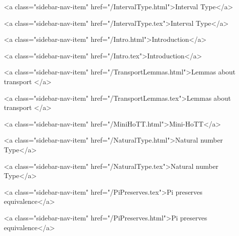           <a class="sidebar-nav-item" href="/IntervalType.html">Interval Type</a>
        
      
    
      
        
          <a class="sidebar-nav-item" href="/IntervalType.tex">Interval Type</a>
        
      
    
      
        
          <a class="sidebar-nav-item" href="/Intro.html">Introduction</a>
        
      
    
      
        
          <a class="sidebar-nav-item" href="/Intro.tex">Introduction</a>
        
      
    
      
        
          <a class="sidebar-nav-item" href="/TransportLemmas.html">Lemmas about transport </a>
        
      
    
      
        
          <a class="sidebar-nav-item" href="/TransportLemmas.tex">Lemmas about transport </a>
        
      
    
      
        
          <a class="sidebar-nav-item" href="/MiniHoTT.html">Mini-HoTT</a>
        
      
    
      
        
          <a class="sidebar-nav-item" href="/NaturalType.html">Natural number Type</a>
        
      
    
      
        
          <a class="sidebar-nav-item" href="/NaturalType.tex">Natural number Type</a>
        
      
    
      
        
          <a class="sidebar-nav-item" href="/PiPreserves.tex">Pi preserves equivalence</a>
        
      
    
      
        
          <a class="sidebar-nav-item" href="/PiPreserves.html">Pi preserves equivalence</a>
        
      
    
